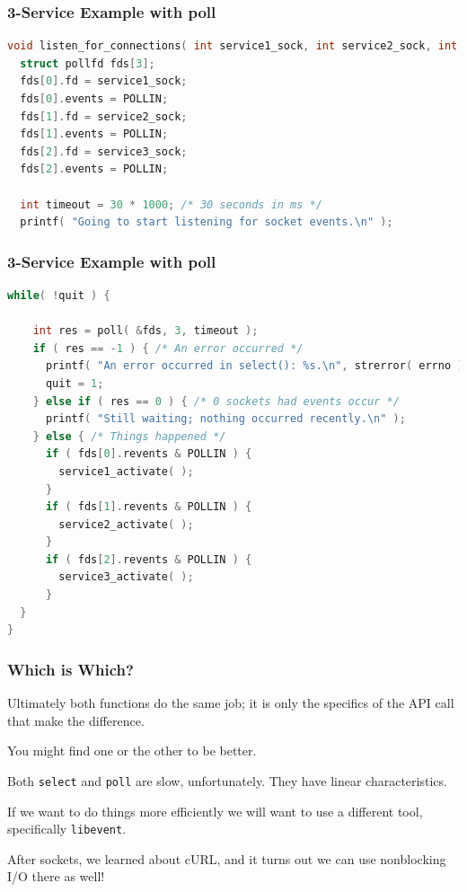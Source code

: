 \begin{frame}[fragile]
\frametitle{3-Service Example with poll}
\begin{lstlisting}[language=C]
void listen_for_connections( int service1_sock, int service2_sock, int service3_sock ) {
  struct pollfd fds[3];
  fds[0].fd = service1_sock;
  fds[0].events = POLLIN;
  fds[1].fd = service2_sock;
  fds[1].events = POLLIN;
  fds[2].fd = service3_sock;
  fds[2].events = POLLIN;
 
  int timeout = 30 * 1000; /* 30 seconds in ms */ 
  printf( "Going to start listening for socket events.\n" );
\end{lstlisting}

\end{frame}

\begin{frame}[fragile]
\frametitle{3-Service Example with poll}
\begin{lstlisting}[language=C]
  while( !quit ) {
    
    int res = poll( &fds, 3, timeout );
    if ( res == -1 ) { /* An error occurred */
      printf( "An error occurred in select(): %s.\n", strerror( errno ) );
      quit = 1;
    } else if ( res == 0 ) { /* 0 sockets had events occur */
      printf( "Still waiting; nothing occurred recently.\n" );
    } else { /* Things happened */
      if ( fds[0].revents & POLLIN ) {
        service1_activate( ); 
      }
      if ( fds[1].revents & POLLIN ) {
        service2_activate( ); 
      }
      if ( fds[2].revents & POLLIN ) {
        service3_activate( ); 
      }
  }
}
\end{lstlisting}

\end{frame}


\begin{frame}
\frametitle{Which is Which?}

Ultimately both functions do the same job; it is only the specifics of the API call that make the difference.

You might find one or the other to be better.

Both \texttt{select} and \texttt{poll} are slow, unfortunately. They have linear characteristics.

If we want to do things more efficiently we will want to use a different tool, specifically \texttt{libevent}.

 After sockets, we learned about cURL, and it turns out we can use nonblocking I/O there as well!

\end{frame}





